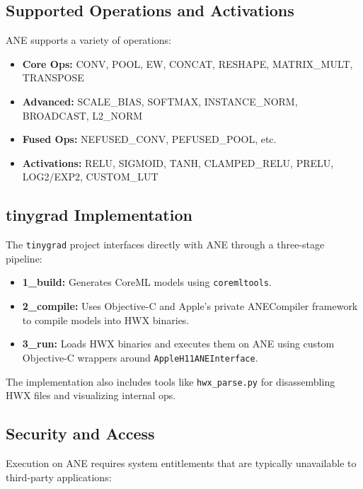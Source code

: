 \subsection{Supported Operations and Activations}

ANE supports a variety of operations:

\begin{itemize}
  \item \textbf{Core Ops:} CONV, POOL, EW, CONCAT, RESHAPE, MATRIX\_MULT, TRANSPOSE
  \item \textbf{Advanced:} SCALE\_BIAS, SOFTMAX, INSTANCE\_NORM, BROADCAST, L2\_NORM
  \item \textbf{Fused Ops:} NEFUSED\_CONV, PEFUSED\_POOL, etc.
  \item \textbf{Activations:} RELU, SIGMOID, TANH, CLAMPED\_RELU, PRELU, LOG2/EXP2, CUSTOM\_LUT
\end{itemize}


\subsection{tinygrad Implementation}

The \texttt{tinygrad} project interfaces directly with ANE through a three-stage pipeline:

\begin{itemize}
  \item \textbf{1\_build:} Generates CoreML models using \texttt{coremltools}.
  \item \textbf{2\_compile:} Uses Objective-C and Apple's private ANECompiler framework to compile models into HWX binaries.
  \item \textbf{3\_run:} Loads HWX binaries and executes them on ANE using custom Objective-C wrappers around \texttt{AppleH11ANEInterface}.
\end{itemize}

The implementation also includes tools like \texttt{hwx\_parse.py} for disassembling HWX files and visualizing internal ops.

\subsection{Security and Access}

Execution on ANE requires system entitlements that are typically unavailable to third-party applications:

